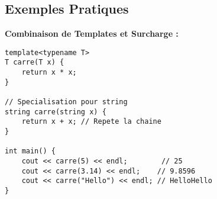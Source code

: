 \subsection{ Exemples Pratiques}
\textbf{Combinaison de Templates et Surcharge :}
\begin{tcolorbox}[colframe=blue!50!black, colback=blue!5!white, title=Exemple de Combinaison de Templates et Surcharge]
\begin{verbatim}
template<typename T>
T carre(T x) {
    return x * x;
}

// Specialisation pour string
string carre(string x) {
    return x + x; // Repete la chaine
}

int main() {
    cout << carre(5) << endl;        // 25
    cout << carre(3.14) << endl;    // 9.8596
    cout << carre("Hello") << endl; // HelloHello
}
\end{verbatim}
\end{tcolorbox}

